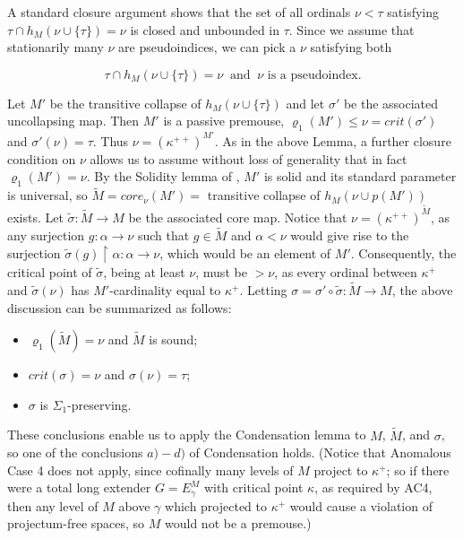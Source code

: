 \documentclass[12pt]{article}
\begin{document}
\bigskip

A standard closure argument shows that the set of all ordinals $\nu < \tau$ satisfying $\tau \cap h_M (\nu \cup \{ \tau \} ) = \nu$ is closed and unbounded in $\tau$.  Since we assume that stationarily many $\nu$ are pseudoindices, we can pick a $\nu$ satisfying both

\[
\tau \cap h_M ( \nu \cup \{ \tau \} ) = \nu \ \text{ and } \ \nu \text{ is a pseudoindex.}
\]

Let $M'$ be the transitive collapse of $h_M (\nu \cup \{ \tau \} )$ and let $\sigma'$ be the associated uncollapsing map.  Then $M'$ is a passive premouse, $\varrho_1 (M' ) \leq \nu = crit (\sigma' )$ and $\sigma' (\nu ) = \tau$.  Thus $\nu = ( \kappa^{++} )^{M' }$.  As in the above Lemma, a further closure condition on $\nu$ allows us to assume without loss of generality that in fact $\varrho_1 (M' ) = \nu$.  By the Solidity lemma of \cite{FSPIPM}, $M'$ is solid and its standard parameter is universal, so $\tilde{M} = core_\nu (M' ) =$ transitive collapse of $h_M ( \nu \cup p(M') )$ exists.  Let $\tilde{\sigma} : \tilde{M} \longrightarrow M$ be the associated core map.  Notice that $\nu = (\kappa^{++})^{\tilde{M}}$, as any surjection $g: \alpha \longrightarrow \nu$ such that $g \in \tilde{M}$ and $\alpha < \nu$ would give rise to the surjection $\tilde{\sigma} (g) \restriction \alpha : \alpha \longrightarrow \nu$, which would be an element of $M'$. Consequently, the critical point of $\tilde{\sigma }$, being at least $\nu$, must be $> \nu$, as every ordinal between $\kappa^+$ and $\tilde{\sigma} (\nu)$ has $M'$-cardinality equal to $\kappa^+$.  Letting $\sigma = \sigma' \circ \tilde{\sigma}: \tilde{M} \longrightarrow M$, the above discussion can be summarized as follows:

\begin{itemize}
\item{$\varrho_1 (\tilde{M} ) = \nu$ and $\tilde{M}$ is sound;}
\item{$crit (\sigma )= \nu$ and $\sigma (\nu ) = \tau$;}
\item{$\sigma$ is $\Sigma_1$-preserving.}
\end{itemize}

These conclusions enable us to apply the Condensation lemma to $M$, $\tilde{M}$, and $\sigma$, so one of the conclusions $a) - d)$ of Condensation holds.  (Notice that Anomalous Case 4 does not apply, since cofinally many levels of $M$ project to $\kappa^+$; so if there were a total long extender $G = E_\gamma^M$ with critical point $\kappa$, as required by AC4, then any level of $M$ above $\gamma$ which projected to $\kappa^+$ would cause a violation of projectum-free spaces, so $M$ would not be a premouse.)\\
\end{document}
